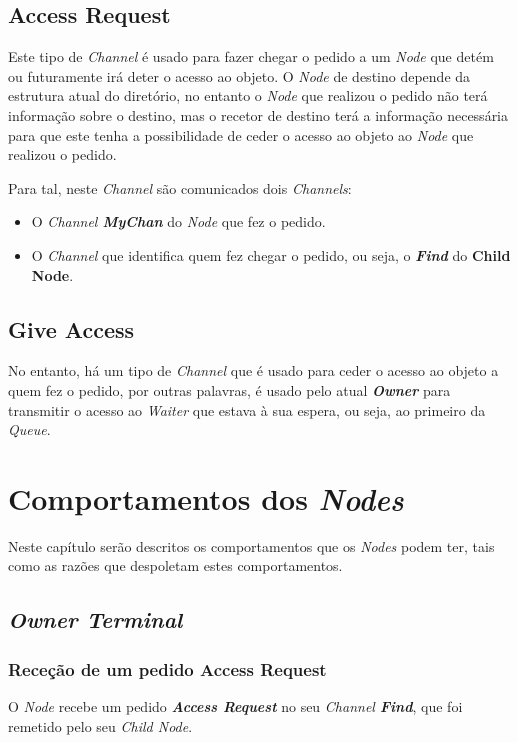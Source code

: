 \subsection*{Access Request}
Este tipo de \emph{Channel} é usado para fazer chegar o pedido a um \emph{Node} que detém ou futuramente irá deter o acesso ao objeto. O \emph{Node} de destino depende da estrutura atual do diretório, no entanto o \emph{Node} que realizou o pedido não terá informação sobre o destino, mas o recetor de destino terá a informação necessária para que este tenha a possibilidade de ceder o acesso ao objeto ao \emph{Node} que realizou o pedido.

Para tal, neste \emph{Channel} são comunicados dois \emph{Channels}:
\begin{itemize} \item O \emph{Channel \textbf{MyChan}} do \emph{Node} que fez o pedido.
    \item O \emph{Channel} que identifica quem fez chegar o pedido, ou seja, o \emph{\textbf{Find}} do \textbf{Child Node}.
\end{itemize}


\subsection*{Give Access}
No entanto, há um tipo de \emph{Channel} que é usado para ceder o acesso ao objeto a quem fez o pedido, por outras palavras, é usado pelo atual \emph{\textbf{Owner}} para transmitir o acesso ao \emph{Waiter} que estava à sua espera, ou seja, ao primeiro da \emph{Queue}.



\section{Comportamentos dos \emph{Nodes}}
\label{especificacao:sec:comportamentos_nodes}

Neste capítulo serão descritos os comportamentos que os \emph{Nodes} podem ter, tais como as razões que despoletam estes comportamentos.

\subsection*{\emph{Owner Terminal}}
\label{especificacao:nodes:owner_terminal}


\subsubsection*{Receção de um pedido Access Request}
O \emph{Node} recebe um pedido \emph{\textbf{Access Request}} no seu \emph{Channel \textbf{Find}},
que foi remetido pelo seu \emph{Child Node}. 


